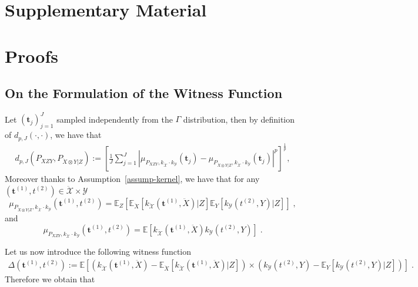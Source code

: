     \onecolumn
\section*{Supplementary Material}
\section{Proofs}
\subsection{On the Formulation of the Witness Function}
\label{form-witness}
Let $(\mathbf{t}_j)_{j=1}^J$ sampled independently from the $\Gamma$ distribution, then by definition of $d_{p,J}(\cdot,\cdot)$, we have that
\begin{align*}
\label{eq-dlp_J}
    d_{p,J}(P_{XZY},P_{\ddot{X}\otimes Y|Z}):=\left[\frac{1}{J}\sum_{j=1}^J \left|\mu_{P_{XZY},k_{\mathcal{\ddot{X}}}\cdot k_{\mathcal{Y}}}(\mathbf{t}_j)-\mu_{P_{\ddot{X}\otimes Y|Z},k_{\mathcal{\ddot{X}}}\cdot k_{\mathcal{Y}}}(\mathbf{t}_j)\right|^p\right]^{\frac{1}{p}},
\end{align*}
Moreover thanks to Assumption~\ref{assump-kernel}, we have that for any $(\mathbf{t}^{(1)},t^{(2)})\in\mathcal{\ddot{X}}\times\mathcal{Y}$ 
\begin{equation*}
    \mu_{P_{\ddot{X}\otimes Y|Z},k_{\mathcal{\ddot{X}}}\cdot k_{\mathcal{Y}}}(\mathbf{t}^{(1)},t^{(2)})=
    \mathbb{E}_{Z}\left[\mathbb{E}_{\ddot{X}}\left[k_{\mathcal{\ddot{X}}}(\mathbf{t}^{(1)},\ddot{X})|Z\right]
    \mathbb{E}_{Y}\left[k_{\mathcal{Y}}(t^{(2)},Y)|Z\right] \right]\; ,
\end{equation*}
and 
\begin{equation*}
    \mu_{P_{XZY},k_{\mathcal{\ddot{X}}}\cdot k_{\mathcal{Y}}}(\mathbf{t}^{(1)},t^{(2)})=
    \mathbb{E}\left[k_{\mathcal{\ddot{X}}}(\mathbf{t}^{(1)},\ddot{X})
 k_{\mathcal{Y}}(t^{(2)},Y) \right]\; .
\end{equation*}


Let us now introduce the following witness function
\begin{align*}
    \Delta(\mathbf{t}^{(1)},t^{(2)}) :=\mathbb{E}\left[\left(k_{\mathcal{\ddot{X}}}(\mathbf{t}^{(1)},\ddot{X})- \mathbb{E}_{\ddot{X}}\left[k_{\mathcal{\ddot{X}}}(\mathbf{t}^{(1)},\ddot{X})|Z\right]\right)\times\left(k_{\mathcal{Y}}(t^{(2)},Y)- \mathbb{E}_{Y}\left[k_{\mathcal{Y}}(t^{(2)},Y)|Z\right]\right)\right]\;.
\end{align*}
Therefore we obtain that

